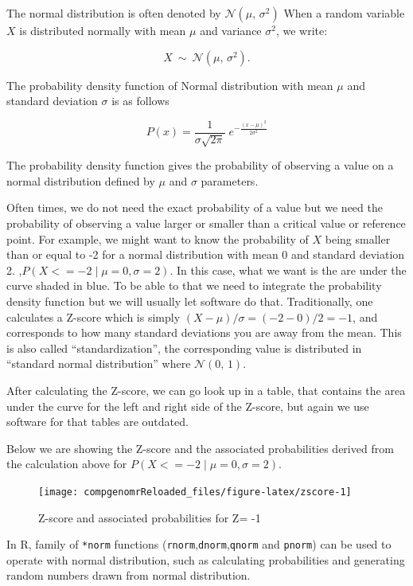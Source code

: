\documentclass[12pt,]{krantz}
\begin{document}
The normal distribution is often denoted by \(\mathcal{N}(\mu,\,\sigma^2)\) When a random variable \(X\) is distributed normally with mean \(\mu\) and variance \(\sigma^2\), we write:

\[X\ \sim\ \mathcal{N}(\mu,\,\sigma^2).\]

The probability
density function of Normal distribution with mean \(\mu\) and standard deviation
\(\sigma\) is as follows

\[P(x)=\frac{1}{\sigma\sqrt{2\pi} } \; e^{ -\frac{(x-\mu)^2}{2\sigma^2} } \]

The probability density function gives the probability of observing a value
on a normal distribution defined by \(\mu\) and
\(\sigma\) parameters.

Often times, we do not need the exact probability of a value but we need the
probability of observing a value larger or smaller than a critical value or reference
point. For example, we might want to know the probability of \(X\) being smaller than or
equal to -2 for a normal distribution with mean 0 and standard deviation 2.
,\(P(X <= -2 \; | \; \mu=0,\sigma=2)\). In this case, what we want is the are under the
curve shaded in blue. To be able to that we need to integrate the probability
density function but we will usually let software do that. Traditionally,
one calculates a Z-score which is simply \((X-\mu)/\sigma=(-2-0)/2= -1\), and
corresponds to how many standard deviations you are away from the mean.
This is also called ``standardization'', the corresponding value is distributed in ``standard normal distribution'' where \(\mathcal{N}(0,\,1)\).

After calculating the Z-score,
we can go look up in a table, that contains the area under the curve for
the left and right side of the Z-score, but again we use software for that
tables are outdated.

Below we are showing the Z-score and the associated probabilities derived
from the calculation above for \(P(X <= -2 \; | \; \mu=0,\sigma=2)\).

\begin{figure}

{\centering \texttt{[image: compgenomrReloaded\_files/figure-latex/zscore-1]} 

}

\caption{Z-score and associated probabilities for Z= -1}\label{fig:zscore}
\end{figure}

In R, family of \texttt{*norm} functions (\texttt{rnorm},\texttt{dnorm},\texttt{qnorm} and \texttt{pnorm}) can
be used to
operate with normal distribution, such as calculating probabilities and
generating random numbers drawn from normal distribution.
\end{document}
